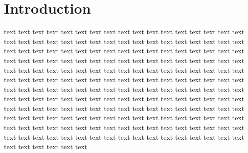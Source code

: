 \chapter {Introduction}

text text text text text text text text text text text text text text text
text text text text text text text text text text text text text text text
text text text text text text text text text text text text text text text
text text text text text text text text text text text text text text text
text text text text text text text text text text text text text text text
text text text text text text text text text text text text text text text
text text text text text text text text text text text text text text text
text text text text text text text text text text text text text text text
text text text text text text text text text text text text text text text
text text text text text text text text text text text text text text text
text text text text text text text text text text text text text text text
text text text text text text text text text text text text text text text
text text text text text text text text text text text text text text text
text text text text text text text text text text text text text text text
\cite{Vanderplas2012}